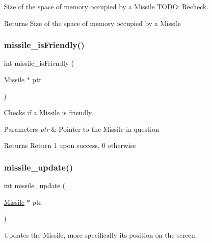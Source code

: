 Size of the space of memory occupied by a Missile T\+O\+DO\+: Recheck. 

\begin{DoxyReturn}{Returns}
Size of the space of memory occupied by a Missile 
\end{DoxyReturn}
\hypertarget{group___missile_gae9eff55a2ebd486cc44daf149176e771}{}\label{group___missile_gae9eff55a2ebd486cc44daf149176e771} 
\subsubsection{\texorpdfstring{missile\+\_\+is\+Friendly()}{missile\_isFriendly()}}
{\footnotesize\ttfamily int missile\+\_\+is\+Friendly (\begin{DoxyParamCaption}\item[{\hyperlink{group___missile_ga7ea98f7c879356e5dfa41934529d86e1}{Missile} $\ast$}]{ptr }\end{DoxyParamCaption})}



Checks if a Missile is friendly. 


\begin{DoxyParams}{Parameters}
{\em ptr} & Pointer to the Missile in question\\
\hline
\end{DoxyParams}
\begin{DoxyReturn}{Returns}
Return 1 upon success, 0 otherwise 
\end{DoxyReturn}
\hypertarget{group___missile_ga6d0e1c431aa7534db74504a9505a7b60}{}\label{group___missile_ga6d0e1c431aa7534db74504a9505a7b60} 
\subsubsection{\texorpdfstring{missile\+\_\+update()}{missile\_update()}}
{\footnotesize\ttfamily int missile\+\_\+update (\begin{DoxyParamCaption}\item[{\hyperlink{group___missile_ga7ea98f7c879356e5dfa41934529d86e1}{Missile} $\ast$}]{ptr }\end{DoxyParamCaption})}



Updates the Missile, more specifically its position on the screen. 


